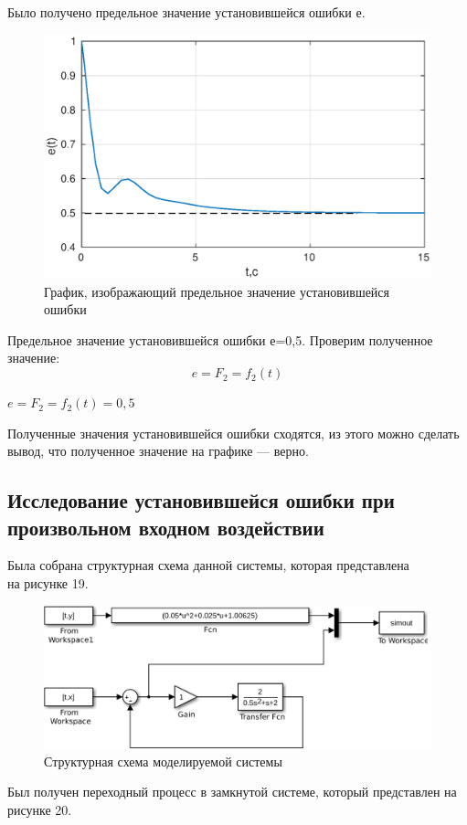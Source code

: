 \documentclass[12pt,a4paper]{article}
\begin{document}
Было получено предельное значение установившейся ошибки е.
\begin{figure}[H]
\centering
\includegraphics[width=\textwidth]{1/3_3e(t).eps}
\caption{График, изображающий предельное значение установившейся ошибки}
\end{figure}

Предельное значение установившейся ошибки е=0,5.
Проверим полученное значение:
\begin{equation}
e=F_{2}=f_{2}(t)
\end{equation}
\begin{center}
$e=F_{2}=f_{2}(t)=0,5$
\end{center}



Полученные значения установившейся ошибки сходятся, из этого можно сделать вывод, что полученное значение на графике — верно.

\newpage
\begin{center}
\section{Исследование установившейся ошибки при произвольном входном воздействии}
\end{center}

Была собрана структурная схема данной системы, которая представлена \\на рисунке 19.

\begin{figure}[H]
\centering
\includegraphics[width=\textwidth]{1/4.eps}
\caption{Структурная схема моделируемой  системы}
\end{figure}
Был получен переходный процесс в замкнутой системе, который представлен на рисунке 20.
\end{document}
